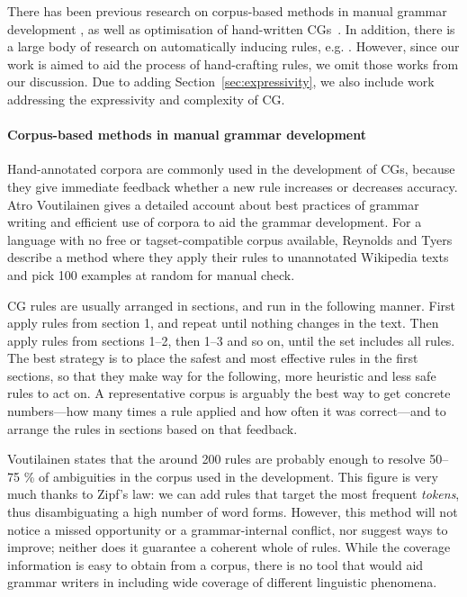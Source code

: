 There has been previous research on corpus-based methods in manual
grammar development \cite{voutilainen2004}, as well as optimisation of
hand-written CGs~\cite{bick2013tuning}.  In addition, there is a large
body of research on automatically inducing rules,
e.g. \cite{inducing_cg1996,lindberg_eineborg98ilp,lager01transformation,asfrent14}.
However, since our work is aimed to aid the process of hand-crafting
rules, we omit those works from our discussion. Due to adding
Section~\ref{sec:expressivity}, we also include work addressing the
  expressivity and complexity of CG.


\paragraph{Corpus-based methods in manual grammar development}

Hand-annotated corpora are commonly used in the development of CGs, because they give immediate feedback whether a new rule increases or decreases accuracy.
Atro Voutilainen \cite{voutilainen2004} gives a detailed account about best practices of grammar writing and efficient use of corpora to aid the grammar development.
For a language with no free or tagset-compatible corpus available, Reynolds and Tyers \cite{tyers_reynolds2015} describe a method where they apply their rules to unannotated Wikipedia texts and pick 100 examples at random for manual check.

CG rules are usually arranged in sections, and run in the following manner. 
First apply rules from section 1, and repeat until nothing changes in the text. Then apply rules from sections 1--2, then 1--3 and so on, until the set includes all rules.
The best strategy is to place the safest and most effective rules in the first sections,
so that they make way for the following, more heuristic and less safe rules to act on.
A representative corpus is arguably the best way to get concrete numbers---how many times a rule applied and how often it was correct---and to arrange the rules in sections based on that feedback.

Voutilainen \cite{voutilainen2004} states that the around 200 rules are probably enough to resolve 50--75 \% of ambiguities in the corpus used in the development. 
This figure is very much thanks to Zipf's law: we can add rules that target the most frequent \emph{tokens}, thus disambiguating a high number of word forms.
However, this method will not notice a missed opportunity or a grammar-internal conflict, nor suggest ways to improve; neither does it guarantee a coherent whole of rules. 
While the coverage information is easy to obtain from a corpus, there is no tool that would aid grammar writers in including wide coverage of different linguistic phenomena.


